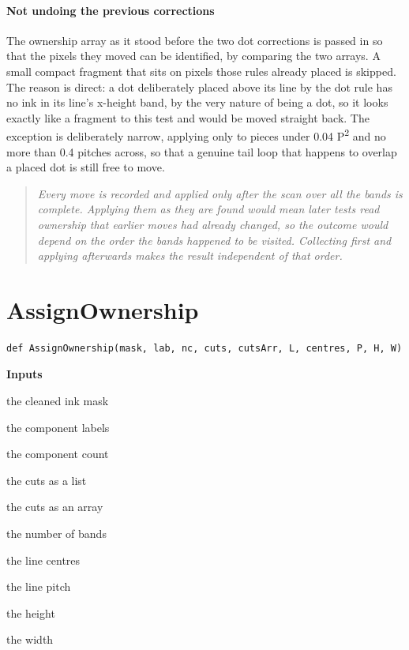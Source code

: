 \paragraph{Not undoing the previous corrections}
The ownership array as it stood before the two dot corrections is passed in so that the pixels they moved can be identified, by comparing the two arrays. A small compact fragment that sits on pixels those rules already placed is skipped. The reason is direct: a dot deliberately placed above its line by the dot rule has no ink in its line's x-height band, by the very nature of being a dot, so it looks exactly like a fragment to this test and would be moved straight back. The exception is deliberately narrow, applying only to pieces under 0.04 P\textsuperscript{2} and no more than 0.4 pitches across, so that a genuine tail loop that happens to overlap a placed dot is still free to move.


\begin{quote}\small\itshape Every move is recorded and applied only after the scan over all the bands is complete. Applying them as they are found would mean later tests read ownership that earlier moves had already changed, so the outcome would depend on the order the bands happened to be visited. Collecting first and applying afterwards makes the result independent of that order.\end{quote}

\section{AssignOwnership}
\begin{lstlisting}[style=sig]
def AssignOwnership(mask, lab, nc, cuts, cutsArr, L, centres, P, H, W)
\end{lstlisting}

\noindent\textbf{Inputs}
\begin{description}[leftmargin=2.2em,style=nextline,font=\normalfont\ttfamily]\setlength\itemsep{1pt}
  \item[{mask}] \normalfont the cleaned ink mask
  \item[{lab}] \normalfont the component labels
  \item[{nc}] \normalfont the component count
  \item[{cuts}] \normalfont the cuts as a list
  \item[{cutsArr}] \normalfont the cuts as an array
  \item[{L}] \normalfont the number of bands
  \item[{centres}] \normalfont the line centres
  \item[{P}] \normalfont the line pitch
  \item[{H}] \normalfont the height
  \item[{W}] \normalfont the width
\end{description}

